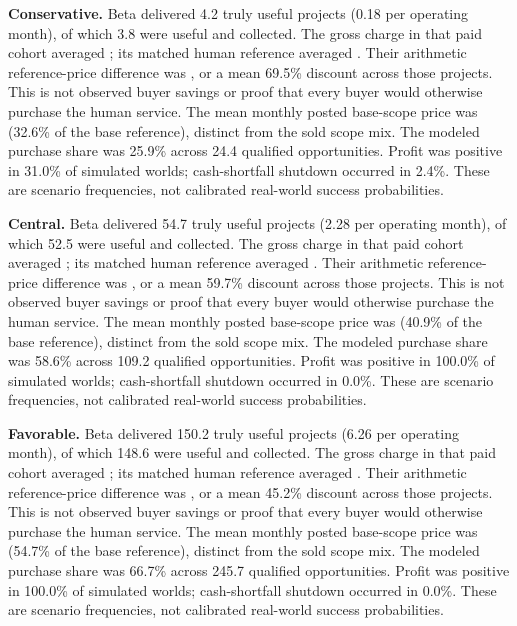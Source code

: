 \textbf{Conservative.} Beta delivered 4.2 truly useful projects (0.18 per operating month), of which 3.8 were useful and collected. The gross charge in that paid cohort averaged ; its matched human reference averaged . Their arithmetic reference-price difference was , or a mean 69.5\% discount across those projects. This is not observed buyer savings or proof that every buyer would otherwise purchase the human service. The mean monthly posted base-scope price was  (32.6\% of the base reference), distinct from the sold scope mix. The modeled purchase share was 25.9\% across 24.4 qualified opportunities. Profit was positive in 31.0\% of simulated worlds; cash-shortfall shutdown occurred in 2.4\%. These are scenario frequencies, not calibrated real-world success probabilities.

\textbf{Central.} Beta delivered 54.7 truly useful projects (2.28 per operating month), of which 52.5 were useful and collected. The gross charge in that paid cohort averaged ; its matched human reference averaged . Their arithmetic reference-price difference was , or a mean 59.7\% discount across those projects. This is not observed buyer savings or proof that every buyer would otherwise purchase the human service. The mean monthly posted base-scope price was  (40.9\% of the base reference), distinct from the sold scope mix. The modeled purchase share was 58.6\% across 109.2 qualified opportunities. Profit was positive in 100.0\% of simulated worlds; cash-shortfall shutdown occurred in 0.0\%. These are scenario frequencies, not calibrated real-world success probabilities.

\textbf{Favorable.} Beta delivered 150.2 truly useful projects (6.26 per operating month), of which 148.6 were useful and collected. The gross charge in that paid cohort averaged ; its matched human reference averaged . Their arithmetic reference-price difference was , or a mean 45.2\% discount across those projects. This is not observed buyer savings or proof that every buyer would otherwise purchase the human service. The mean monthly posted base-scope price was  (54.7\% of the base reference), distinct from the sold scope mix. The modeled purchase share was 66.7\% across 245.7 qualified opportunities. Profit was positive in 100.0\% of simulated worlds; cash-shortfall shutdown occurred in 0.0\%. These are scenario frequencies, not calibrated real-world success probabilities.

